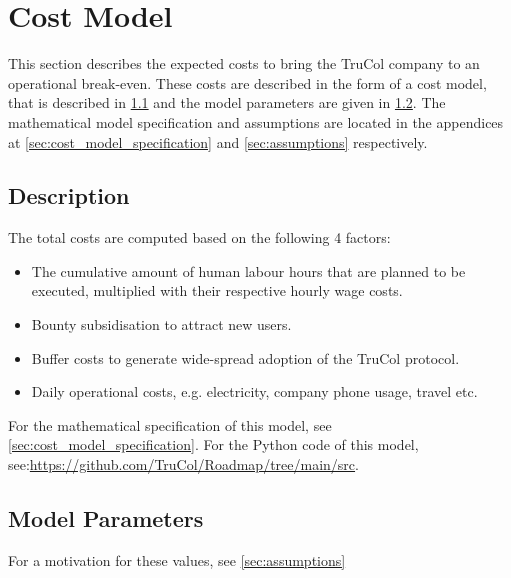 \section{Cost Model}\label{sec:cost_model}
This section describes the expected costs to bring the TruCol company to an operational break-even. These costs are described in the form of a cost model, that is described in \cref{subsec:model_description} and the model parameters are given in \cref{subsec:model_parameters}. The mathematical model specification and assumptions are located in the appendices at \cref{sec:cost_model_specification} and \cref{sec:assumptions} respectively.

\subsection{Description}\label{subsec:model_description}
The total costs are computed based on the following 4 factors:
\begin{itemize}
	\item The cumulative amount of human labour hours that are planned to be executed, multiplied with their respective hourly wage costs.
	\item Bounty subsidisation to attract new users.
	\item Buffer costs to generate wide-spread adoption of the TruCol protocol.
    \item Daily operational costs, e.g. electricity, company phone usage, travel etc.
\end{itemize}
For the mathematical specification of this model, see \cref{sec:cost_model_specification}. For the Python code of this model, see:\url{https://github.com/TruCol/Roadmap/tree/main/src}.

\subsection{Model Parameters}\label{subsec:model_parameters}

\ifx\homepath\overleafhome
\else
\fi
For a motivation for these values, see \cref{sec:assumptions}
